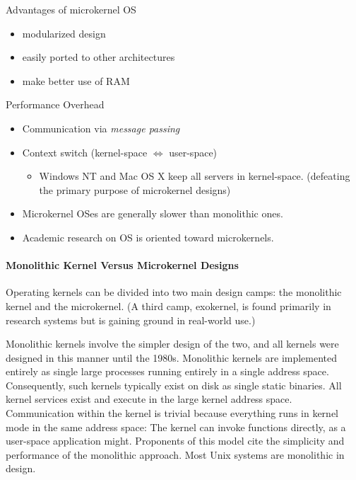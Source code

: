 \begin{frame}
  \begin{block}{Advantages of microkernel OS}
    \begin{itemize}
    \item modularized design
    \item easily ported to other architectures
    \item make better use of RAM
    \end{itemize}
  \end{block}
  \begin{block}{Performance Overhead}
    \begin{itemize}
    \item Communication via \emph{message passing}
    \item Context switch (kernel-space $\Leftrightarrow$ user-space)
      \begin{itemize}
      \item Windows NT and Mac OS X keep all servers in kernel-space. (defeating the
        primary purpose of microkernel designs)
      \end{itemize}
    \end{itemize}
  \end{block}
  \begin{itemize}
  \item Microkernel OSes are generally slower than monolithic ones.
  \item Academic research on OS is oriented toward microkernels.
  \end{itemize}
\end{frame}

\paragraph{Monolithic Kernel Versus Microkernel Designs}

Operating kernels can be divided into two main design camps: the monolithic kernel and the
microkernel. (A third camp, exokernel, is found primarily in research systems but is
gaining ground in real-world use.) 

Monolithic kernels involve the simpler design of the two, and all kernels were designed in
this manner until the 1980s. Monolithic kernels are implemented entirely as single large
processes running entirely in a single address space. Consequently, such kernels typically
exist on disk as single static binaries. All kernel services exist and execute in the
large kernel address space. Communication within the kernel is trivial because everything
runs in kernel mode in the same address space: The kernel can invoke functions directly,
as a user-space application might. Proponents of this model cite the simplicity and
performance of the monolithic approach. Most Unix systems are monolithic in design.

